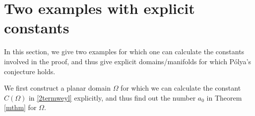 \documentclass[11pt,letterpaper]{amsart}
\numberwithin{equation}{section}
\theoremstyle{plain}
\theoremstyle{plain}
\numberwithin{equation}{section}
\theoremstyle{remark}
\begin{document}
\section{Two examples with explicit constants}\label{twoex}

In this section, we give two examples for which one can calculate the constants involved in the proof, and thus give  explicit domains/manifolds for which P\'olya's conjecture holds. 

We first construct a planar domain $\Omega$ 
for which we can calculate the constant $C(\Omega)$ in \eqref{2termweyl} explicitly, and thus find out the number $a_0$  in Theorem \ref{mthm} for  $\Omega$. 
\end{document}
